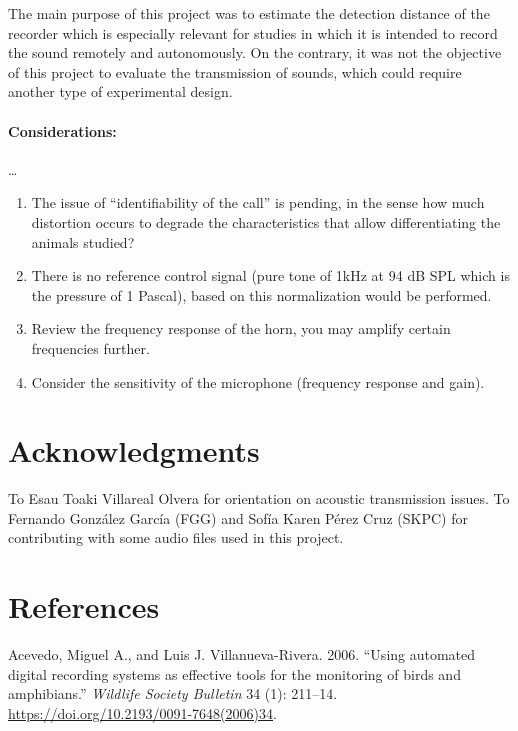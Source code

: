\documentclass[fleqn,10pt,lineno]{wlpeerj} %
\begin{document}
The main purpose of this project was to estimate the detection distance
of the recorder which is especially relevant for studies in which it is
intended to record the sound remotely and autonomously. On the contrary,
it was not the objective of this project to evaluate the transmission of
sounds, which could require another type of experimental design.

\paragraph{Considerations:}

\dots

\begin{enumerate}
\def\labelenumi{\arabic{enumi}.}
\item
  The issue of ``identifiability of the call'' is pending, in the sense
  how much distortion occurs to degrade the characteristics that allow
  differentiating the animals studied?
\item
  There is no reference control signal (pure tone of 1kHz at 94 dB SPL
  which is the pressure of 1 Pascal), based on this normalization would
  be performed.
\item
  Review the frequency response of the horn, you may amplify certain
  frequencies further.
\item
  Consider the sensitivity of the microphone (frequency response and
  gain).
\end{enumerate}

\hypertarget{acknowledgments}{%
\section*{Acknowledgments}\label{acknowledgments}}

To Esau Toaki Villareal Olvera for orientation on acoustic transmission
issues. To Fernando González García (FGG) and Sofía Karen Pérez Cruz
(SKPC) for contributing with some audio files used in this project.

\hypertarget{references}{%
\section*{References}\label{references}}

\hypertarget{refs}{}
\leavevmode\hypertarget{ref-Acevedo2006}{}%
Acevedo, Miguel A., and Luis J. Villanueva-Rivera. 2006. ``Using
automated digital recording systems as effective tools for the
monitoring of birds and amphibians.'' \emph{Wildlife Society Bulletin}
34 (1): 211--14. \url{https://doi.org/10.2193/0091-7648(2006)34}.
\end{document}
